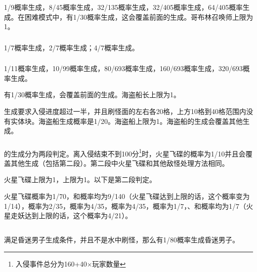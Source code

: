 \subsubsection{}
1/9概率生成，8/45概率生成，32/135概率生成，32/405概率生成，64/405概率生成。在困难模式中，有1/30概率生成，这会覆盖前面的生成。哥布林召唤师上限为1。

\subsubsection{}
1/7概率生成，2/7概率生成；4/7概率生成。

\subsubsection{}
1/11概率生成，10/99概率生成，80/693概率生成，160/693概率生成，320/693概率生成。

有1/30概率生成，会覆盖前面的生成。海盗船长上限为1。

生成要求入侵进度超过一半，并且刷怪面的左右各20格，上方10格到40格范围内没有实体块。海盗船生成概率是1/20。海盗船上限为1。海盗船的生成会覆盖其他生成。

\subsubsection{}
的生成分为两段判定。离入侵结束不到100分\footnote{入侵事件总分为160+40$\times$玩家数量}时，火星飞碟的概率为1/10并且会覆盖其他生成（包括第二段）。第二段中火星飞碟和其他敌怪处理方法相同。

火星飞碟上限为1，上限为1。以下是第二段判定。

火星飞碟概率为1/70，和概率均为9/140（火星飞碟达到上限的话，这个概率变为1/14），概率为2/35，概率为4/35，概率为4/35，概率为1/7，、和概率均为1/7（火星走妖达到上限的话，这个概率为4/21）。

\subsection{}
满足昏迷男子生成条件，并且不是水中刷怪，那么有1/80概率生成昏迷男子。

